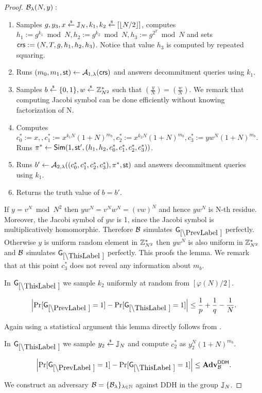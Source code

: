 \begin{proof}
$\mathcal{B}_{\lambda}(N,y):$
\vspace{-2mm}
\begin{enumerate}
\item Samples $g, y_3, x \stackrel{{\scriptscriptstyle\$}}{\leftarrow} \mathbb{J}_N, k_1, k_2 \stackrel{{\scriptscriptstyle\$}}{\leftarrow} [\left\lfloor N/2 \right\rfloor]$, computes $h_1 := g^{k_1} \bmod N, h_2 := g^{k_2} \bmod N,  h_3 := g^{2^{T}} \bmod N$ and sets $\mathsf{crs}:=(N, T, g, h_1, h_2, h_3)$. Notice that value $h_3$ is computed by repeated squaring.
\item Runs $(m_0, m_1, \mathsf{st}) \leftarrow \mathcal{A}_{1, \lambda}(\mathsf{crs})$ and answers decommitment queries using $k_1$.
\item Samples $b \stackrel{{\scriptscriptstyle\$}}{\leftarrow} \{0,1\}, w \stackrel{{\scriptscriptstyle\$}}{\leftarrow} \mathbb{Z}_{N^2}^*$ such that $\left( \frac{y}{N} \right)= \left( \frac{w}{N} \right)$. We remark that computing Jacobi symbol can be done efficiently without knowing factorization of N.
\item Computes $c_0^*:=x, , c_1^*:=x^{k_1N}(1+N)^{m_b}, c_2^*:=x^{k_2N}(1+N)^{m_b}, c_3^*:=yw^{N}(1+N)^{m_b}$. Runs $\pi^* \leftarrow \mathsf{Sim}(1, \mathsf{st}', (h_1, h_2, c_0^*, c_1^*, c_2^*, c_3^*))$.
\item Runs $b' \leftarrow \mathcal{A}_{2, \lambda}((c_0^*, c_1^*, c_2^*, c_3^*), \pi^*, \mathsf{st})$ and answers decommitment queries using $k_1$.
\item Returns the truth value of $b=b'$.
\end{enumerate}
If $y = v^N \bmod N^2$ then $yw^N = v^N w^N = (vw)^N$ and hence $yw^N$ is N-th residue. Moreover, the Jacobi symbol of $yw$ is 1, since the Jacobi symbol is multiplicatively homomorphic. Therefore $\mathcal{B}$ simulates $\games_\prevgame$ perfectly. Otherwise $y$ is uniform random element in $\mathbb{Z}_{N^2}^*$ then $yw^N$ is also uniform in $\mathbb{Z}_{N^2}^*$ and $\mathcal{B}$ simulates $\games_\thisgame$ perfectly. This proofs the lemma. We remark that at this point $c_3^*$ does not reveal any information about $m_b$. 

In $\games_\thisgame$ we sample $k_2$ uniformly at random from $[\varphi(N)/2]$. 

\begin{lemma}
\[
\left|\Pr[\games_\prevgame = 1] - \Pr[\games_\thisgame = 1]\right| \leq \frac{1}{p}+\frac{1}{q}-\frac{1}{N}.
\]
\end{lemma}

Again using a statistical argument this lemma directly follows from .

In $\games_\thisgame$ we sample $y_2 \stackrel{{\scriptscriptstyle\$}}{\leftarrow} \mathbb{J}_N$ and compute $c_2^*$ as  $y_2^N(1+N)^{m_b}$. 

\begin{lemma}\label{lem:ddh}
\[
\left|\Pr[\games_\prevgame = 1] - \Pr[\games_\thisgame = 1]\right| \leq \advtg_\advB^\ddh.
\]
\end{lemma}
We construct an adversary $\mathcal{B} = \{\mathcal{B}_{\lambda}\}_{\lambda \in \mathbb{N}}$ against DDH in the group $\mathbb{J}_N$. %


\end{proof}

